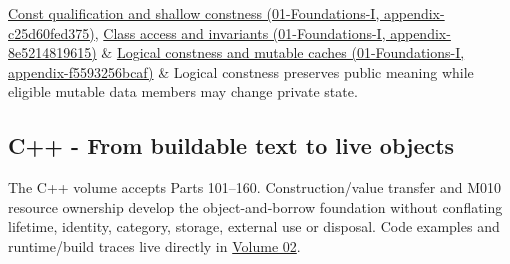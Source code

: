 {\begin{longtable}[]
\href{}{Const qualification and shallow constness (01-Foundations-I, appendix-c25d60fed375)}, \href{}{Class access and invariants (01-Foundations-I, appendix-8e5214819615)} & \href{}{Logical constness and mutable caches (01-Foundations-I, appendix-f5593256bcaf)} & Logical constness preserves public meaning while eligible mutable data members may change private state. \\
\end{longtable}
}

\subsection{C++ - From buildable text to live objects}\label{c---from-buildable-text-to-live-objects}

The C++ volume accepts Parts 101--160. Construction/value transfer and M010 resource ownership develop the object-and-borrow foundation without conflating lifetime, identity, category, storage, external use or disposal. Code examples and runtime/build traces live directly in \href{Continuous\%20Notes/Computing\%20Foundations\%20-\%20From\%20Bits\%20to\%20C++\%20and\%20Systems\%20APIs}{Volume 02}.

